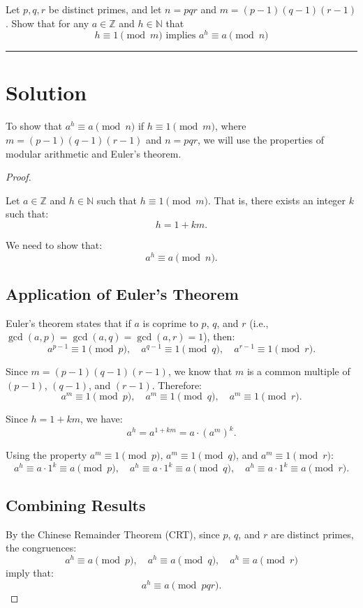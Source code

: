 \documentclass[12pt]{amsart}
\theoremstyle{definition}
\numberwithin{equation}{section}
\newcommand{\Z}{\mathbb{Z}}
\newcommand{\N}{\mathbb{N}}
\begin{document}
\begin{exercise}{2} 
Let \(p, q, r\) be distinct primes, and let \(n = pqr\) and \(m = (p-1)(q-1)(r-1)\). Show that for any \(a \in \Z\) and \(h \in \N\) that 
\[ h \equiv 1 \pmod{m} \text{ implies } a^h \equiv a \pmod{n}\]

\noindent\rule{\linewidth}{1pt}

\section*{Solution}

To show that \(a^h \equiv a \pmod{n}\) if \(h \equiv 1 \pmod{m}\), where \(m = (p-1)(q-1)(r-1)\) and \(n = pqr\), we will use the properties of modular arithmetic and Euler's theorem.

\begin{proof} \( \)

Let \(a \in \mathbb{Z}\) and \(h \in \mathbb{N}\) such that \(h \equiv 1 \pmod{m}\). That is, there exists an integer \(k\) such that:
\[
h = 1 + km.
\]

We need to show that:
\[
a^h \equiv a \pmod{n}.
\]

\subsection*{Application of Euler's Theorem}
Euler's theorem states that if \(a\) is coprime to \(p\), \(q\), and \(r\) (i.e., \(\gcd(a, p) = \gcd(a, q) = \gcd(a, r) = 1\)), then:
\[
a^{p-1} \equiv 1 \pmod{p}, \quad a^{q-1} \equiv 1 \pmod{q}, \quad a^{r-1} \equiv 1 \pmod{r}.
\]

Since \(m = (p-1)(q-1)(r-1)\), we know that \(m\) is a common multiple of \((p-1)\), \((q-1)\), and \((r-1)\). Therefore:
\[
a^m \equiv 1 \pmod{p}, \quad a^m \equiv 1 \pmod{q}, \quad a^m \equiv 1 \pmod{r}.
\]

Since \(h = 1 + km\), we have:
\[
a^h = a^{1 + km} = a \cdot (a^m)^k.
\]

Using the property \(a^m \equiv 1 \pmod{p}\), \(a^m \equiv 1 \pmod{q}\), and \(a^m \equiv 1 \pmod{r}\):
\[
a^h \equiv a \cdot 1^k \equiv a \pmod{p}, \quad a^h \equiv a \cdot 1^k \equiv a \pmod{q}, \quad a^h \equiv a \cdot 1^k \equiv a \pmod{r}.
\]

\subsection*{Combining Results}
By the Chinese Remainder Theorem (CRT), since \(p\), \(q\), and \(r\) are distinct primes, the congruences:
\[
a^h \equiv a \pmod{p}, \quad a^h \equiv a \pmod{q}, \quad a^h \equiv a \pmod{r}
\]
imply that:
\[
a^h \equiv a \pmod{pqr}.
\]


\end{proof}
\end{exercise}
\end{document}
